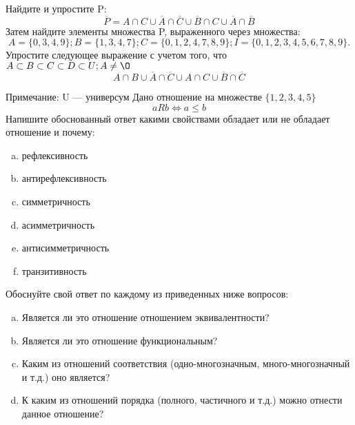 \documentclass[10pt]{exam}
\begin{document}
\begin{questions}
\question
Найдите и упростите P:
\begin{equation*}
\overline{P} = A \cap C \cup \overline{A} \cap \overline{C} \cup \overline{B} \cap C \cup \overline{A} \cap \overline{B}
\end{equation*}
Затем найдите элементы множества P, выраженного через множества:
\begin{equation*}
A = \{0, 3, 4, 9\}; 
B = \{1, 3, 4, 7\};
C = \{0, 1, 2, 4, 7, 8, 9\};
I = \{0, 1, 2, 3, 4, 5, 6, 7, 8, 9\}.
\end{equation*}\question
Упростите следующее выражение с учетом того, что $A\subset B \subset C \subset D \subset U; A \neq \O$
\begin{equation*}
A \cap B \cup \overline{A} \cap \overline{C} \cup A \cap C \cup \overline{B} \cap \overline{C}
\end{equation*}

Примечание: U — универсум\question
Дано отношение на множестве $\{1, 2, 3, 4, 5\}$ 
\begin{equation*}
aRb \iff a \leq b
\end{equation*}
Напишите обоснованный ответ какими свойствами обладает или не обладает отношение и почему:   
\begin{enumerate} [a)]\setcounter{enumi}{0}
\item рефлексивность
\item антирефлексивность
\item симметричность
\item асимметричность
\item антисимметричность
\item транзитивность
\end{enumerate}

Обоснуйте свой ответ по каждому из приведенных ниже вопросов:
\begin{enumerate} [a)]\setcounter{enumi}{0}
    \item Является ли это отношение отношением эквивалентности?
    \item Является ли это отношение функциональным?
    \item Каким из отношений соответствия (одно-многозначным, много-многозначный и т.д.) оно является?
    \item К каким из отношений порядка (полного, частичного и т.д.) можно отнести данное отношение?
\end{enumerate}



\end{questions}
\end{document}

